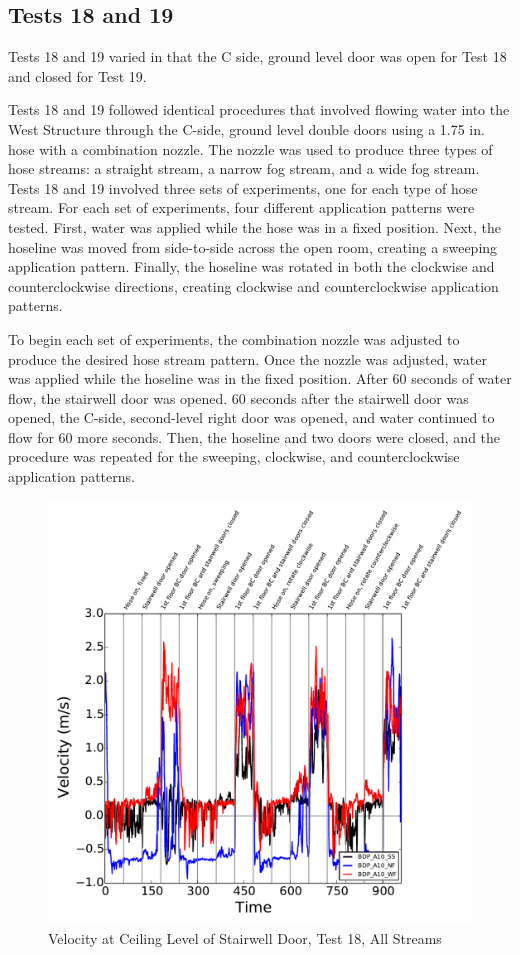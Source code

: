 \documentclass[12pt,oneside]{book}
\begin{document}
\subsection{Tests 18 and 19}
Tests 18 and 19 varied in that the C side, ground level door was open for Test 18 and closed for Test 19. 

Tests 18 and 19 followed identical procedures that involved flowing water into the West Structure through the C-side, ground level double doors using a 1.75 in. hose with a combination nozzle. The nozzle was used to produce three types of hose streams: a straight stream, a narrow fog stream, and a wide fog stream. Tests 18 and 19 involved three sets of experiments, one for each type of hose stream. For each set of experiments, four different application patterns were tested. First, water was applied while the hose was in a fixed position. Next, the hoseline was moved from side-to-side across the open room, creating a sweeping application pattern. Finally, the hoseline was rotated in both the clockwise and counterclockwise directions, creating clockwise and counterclockwise application patterns. 

To begin each set of experiments, the combination nozzle was adjusted to produce the desired hose stream pattern. Once the nozzle was adjusted, water was applied while the hoseline was in the fixed position. After 60 seconds of water flow, the stairwell door was opened. 60 seconds after the stairwell door was opened, the C-side, second-level right door was opened, and water continued to flow for 60 more seconds. Then, the hoseline and two doors were closed, and the procedure was repeated for the sweeping, clockwise, and counterclockwise application patterns.

\begin{figure}[!ht]
\includegraphics[width=6in]{../../Figures/Hose_Test_Figures/Test_18_West_063014BDP_A10_8_All_Streams}
\caption{Velocity at Ceiling Level of Stairwell Door, Test 18, All Streams}
\label{fig:Test_18_West_063014_SS_BDP_A10}
\end{figure}
\end{document}

